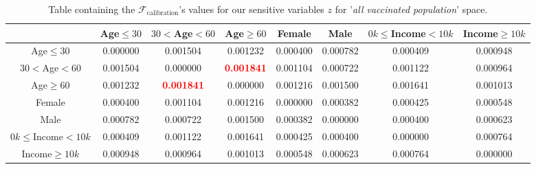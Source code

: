 \documentclass{article}
\begin{document}
\begin{table}[H]
    \begin{adjustbox}{max width=\textwidth}
        \begin{tabular}{|c| c c c c c c c|}
        \hline
          & Age$\leq30$ &    $30<$Age$<60$ &     Age$\geq60$ &    Female &      Male &   $0k\leq$Income$<10k$ &    Income$\geq10k$  \\
        \hline
         Age$\leq30$ & 0.000000 &  0.001504 &  0.001232 &  0.000400 &  0.000782 &  0.000409 &  0.000948 \\
        \hline
        $30<$Age$<60$ &  0.001504 &  0.000000 &  \textbf{\textcolor{red}{0.001841}} &  0.001104 &  0.000722 &  0.001122 &  0.000964 \\
        \hline
        Age$\geq60$ &  0.001232 &  \textbf{\textcolor{red}{0.001841}} &  0.000000 &  0.001216 &  0.001500 &  0.001641 &  0.001013 \\
        \hline
        Female &  0.000400 &  0.001104 &  0.001216 &  0.000000 &  0.000382 &  0.000425 &  0.000548 \\
        \hline
        Male &  0.000782 &  0.000722 &  0.001500 &  0.000382 &  0.000000 &  0.000400 &  0.000623 \\
        \hline
        $0k\leq$Income$<10k$ &  0.000409 &  0.001122 &  0.001641 &  0.000425 &  0.000400 &  0.000000 &  0.000764 \\
        \hline
        Income$\geq10k$ &  0.000948 &  0.000964 &  0.001013 &  0.000548 &  0.000623 &  0.000764 &  0.000000 
        \\ \hline
        \end{tabular}
    \end{adjustbox}
\caption{Table containing the $\mathcal{F}_{\text{calibration}}$'s values for our sensitive variables $z$ for '\textit{all vaccinated population}' space.}
\label{tab:14}
\end{table}
\end{document}
